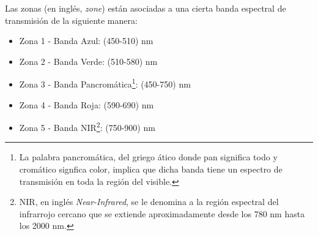 Las zonas (en inglés, \textit{zone}) están asociadas a una cierta banda espectral de transmisión de la siguiente manera:
\begin{itemize}
\item Zona 1 - Banda Azul: (450-510) nm
\item Zona 2 - Banda Verde: (510-580) nm
\item Zona 3 - Banda Pancromática\footnote{La palabra pancromática, del griego ático donde pan significa todo y cromático signfica color, implica que dicha banda tiene un espectro de transmisión en toda la región del visible.}: (450-750) nm
\item Zona 4 - Banda Roja: (590-690) nm
\item Zona 5 - Banda NIR\footnote{NIR, en inglés \textit{Near-Infrared}, se le denomina a la región espectral del infrarrojo cercano que se extiende aproximadamente desde los 780 nm hasta los 2000 nm.}: (750-900) nm
\end{itemize}
 
 \vspace{1cm}
\vspace{1cm}

